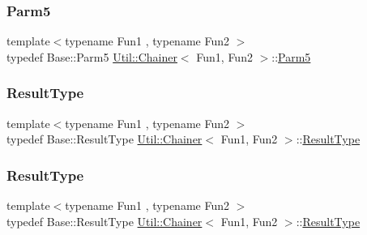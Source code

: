 \mbox{\label{classUtil_1_1Chainer_ac5fdddd223aac1cfb37abd6d681ddf69}} 
\subsubsection{\texorpdfstring{Parm5}{Parm5}\hspace{0.1cm}{\footnotesize\ttfamily [2/2]}}
{\footnotesize\ttfamily template$<$typename Fun1 , typename Fun2 $>$ \\
typedef Base\+::\+Parm5 \mbox{\hyperlink{classUtil_1_1Chainer}{Util\+::\+Chainer}}$<$ Fun1, Fun2 $>$\+::\mbox{\hyperlink{classUtil_1_1Chainer_ac5fdddd223aac1cfb37abd6d681ddf69}{Parm5}}}

\mbox{\label{classUtil_1_1Chainer_a2c8d88a77b8ba93eb915dc799ddafbb9}} 
\subsubsection{\texorpdfstring{ResultType}{ResultType}\hspace{0.1cm}{\footnotesize\ttfamily [1/2]}}
{\footnotesize\ttfamily template$<$typename Fun1 , typename Fun2 $>$ \\
typedef Base\+::\+Result\+Type \mbox{\hyperlink{classUtil_1_1Chainer}{Util\+::\+Chainer}}$<$ Fun1, Fun2 $>$\+::\mbox{\hyperlink{classUtil_1_1Chainer_a2c8d88a77b8ba93eb915dc799ddafbb9}{Result\+Type}}}

\mbox{\label{classUtil_1_1Chainer_a2c8d88a77b8ba93eb915dc799ddafbb9}} 
\subsubsection{\texorpdfstring{ResultType}{ResultType}\hspace{0.1cm}{\footnotesize\ttfamily [2/2]}}
{\footnotesize\ttfamily template$<$typename Fun1 , typename Fun2 $>$ \\
typedef Base\+::\+Result\+Type \mbox{\hyperlink{classUtil_1_1Chainer}{Util\+::\+Chainer}}$<$ Fun1, Fun2 $>$\+::\mbox{\hyperlink{classUtil_1_1Chainer_a2c8d88a77b8ba93eb915dc799ddafbb9}{Result\+Type}}}



